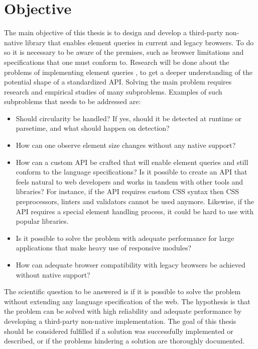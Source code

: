 \documentclass[a4paper,11pt]{kth-mag}
\begin{document}
    \section{Objective}
      The main objective of this thesis is to design and develop a \gls{third-party} non-\gls{native} library that enables element queries in current and legacy \glspl{browser}.
      To do so it is necessary to be aware of the premises, such as \gls{browser} limitations and specifications that one must conform to.
      Research will be done about the problems of implementing element queries , to get a deeper understanding of the potential shape of a standardized \gls{API}.
      Solving the main problem requires research and empirical studies of many subproblems.
      Examples of such subproblems that needs to be addressed are:
      \begin{itemize}
        \item Should circularity be handled? If yes, should it be detected at runtime or parsetime, and what should happen on detection?
        \item How can one observe \gls{element} size changes without any \gls{native} support?
        \item
          How can a custom \gls{API} be crafted that will enable element queries and still conform to the language specifications? Is it possible to create an \gls{API} that feels natural to \gls{web} developers and works in tandem with other tools and libraries?
          For instance, if the \gls{API} requires custom \gls{CSS} syntax then \gls{CSS} preprocessors, linters and validators cannot be used anymore.
          Likewise, if the \gls{API} requires a special \gls{element} handling process, it could be hard to use with popular libraries. 
        \item Is it possible to solve the problem with adequate performance for large applications that make heavy use of \gls{responsive} modules?
        \item How can adequate \gls{browser} compatibility with legacy \glspl{browser} be achieved without \gls{native} support?
      \end{itemize}
      The scientific question to be answered is if it is possible to solve the problem without extending any language specification of the \gls{web}.
      The hypothesis is that the problem can be solved with high reliability and adequate performance by developing a \gls{third-party} non-\gls{native} implementation.
      The goal of this thesis should be considered fulfilled if a solution was successfully implemented or described, or if the problems hindering a solution are thoroughly documented.
\end{document}
